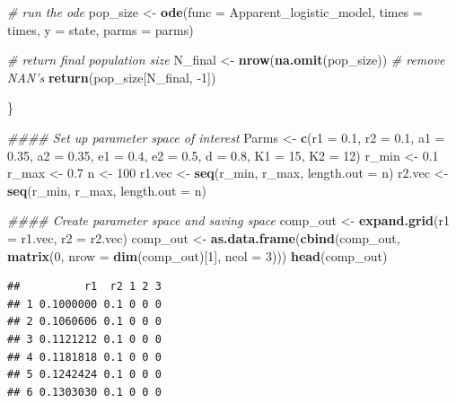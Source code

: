 \documentclass[
]{book}
\newenvironment{Shaded}{\begin{snugshade}}{\end{snugshade}}
\newcommand{\CommentTok}[1]{\textcolor[rgb]{0.56,0.35,0.01}{\textit{#1}}}
\newcommand{\DataTypeTok}[1]{\textcolor[rgb]{0.13,0.29,0.53}{#1}}
\newcommand{\DecValTok}[1]{\textcolor[rgb]{0.00,0.00,0.81}{#1}}
\newcommand{\FloatTok}[1]{\textcolor[rgb]{0.00,0.00,0.81}{#1}}
\newcommand{\KeywordTok}[1]{\textcolor[rgb]{0.13,0.29,0.53}{\textbf{#1}}}
\newcommand{\NormalTok}[1]{#1}
\newcommand{\StringTok}[1]{\textcolor[rgb]{0.31,0.60,0.02}{#1}}
\begin{document}
\begin{Shaded}
\begin{Highlighting}[]
  \CommentTok{# run the ode}
\NormalTok{  pop_size <-}\StringTok{ }\KeywordTok{ode}\NormalTok{(}\DataTypeTok{func =}\NormalTok{ Apparent_logistic_model, }\DataTypeTok{times =}\NormalTok{ times, }\DataTypeTok{y =}\NormalTok{ state, }\DataTypeTok{parms =}\NormalTok{ parms)}

  \CommentTok{# return final population size}
\NormalTok{  N_final <-}\StringTok{ }\KeywordTok{nrow}\NormalTok{(}\KeywordTok{na.omit}\NormalTok{(pop_size))   }\CommentTok{# remove NAN's}
  \KeywordTok{return}\NormalTok{(pop_size[N_final, }\DecValTok{-1}\NormalTok{])}

\NormalTok{\}}


\CommentTok{#### Set up parameter space of interest}
\NormalTok{Parms <-}\StringTok{ }\KeywordTok{c}\NormalTok{(}\DataTypeTok{r1 =} \FloatTok{0.1}\NormalTok{, }\DataTypeTok{r2 =} \FloatTok{0.1}\NormalTok{, }\DataTypeTok{a1 =} \FloatTok{0.35}\NormalTok{, }\DataTypeTok{a2 =} \FloatTok{0.35}\NormalTok{, }\DataTypeTok{e1 =} \FloatTok{0.4}\NormalTok{, }\DataTypeTok{e2 =} \FloatTok{0.5}\NormalTok{, }\DataTypeTok{d =} \FloatTok{0.8}\NormalTok{, }\DataTypeTok{K1 =} \DecValTok{15}\NormalTok{, }\DataTypeTok{K2 =} \DecValTok{12}\NormalTok{)}
\NormalTok{r_min <-}\StringTok{ }\FloatTok{0.1}
\NormalTok{r_max <-}\StringTok{ }\FloatTok{0.7}
\NormalTok{n <-}\StringTok{ }\DecValTok{100}
\NormalTok{r1.vec <-}\StringTok{ }\KeywordTok{seq}\NormalTok{(r_min, r_max, }\DataTypeTok{length.out =}\NormalTok{ n)}
\NormalTok{r2.vec <-}\StringTok{ }\KeywordTok{seq}\NormalTok{(r_min, r_max, }\DataTypeTok{length.out =}\NormalTok{ n)}


\CommentTok{#### Create parameter space and saving space}
\NormalTok{comp_out <-}\StringTok{ }\KeywordTok{expand.grid}\NormalTok{(}\DataTypeTok{r1 =}\NormalTok{ r1.vec, }\DataTypeTok{r2 =}\NormalTok{ r2.vec)}
\NormalTok{comp_out <-}\StringTok{ }\KeywordTok{as.data.frame}\NormalTok{(}\KeywordTok{cbind}\NormalTok{(comp_out,}
                                \KeywordTok{matrix}\NormalTok{(}\DecValTok{0}\NormalTok{, }\DataTypeTok{nrow =} \KeywordTok{dim}\NormalTok{(comp_out)[}\DecValTok{1}\NormalTok{], }\DataTypeTok{ncol =} \DecValTok{3}\NormalTok{)))}
\KeywordTok{head}\NormalTok{(comp_out)}
\end{Highlighting}
\end{Shaded}

\begin{verbatim}
##          r1  r2 1 2 3
## 1 0.1000000 0.1 0 0 0
## 2 0.1060606 0.1 0 0 0
## 3 0.1121212 0.1 0 0 0
## 4 0.1181818 0.1 0 0 0
## 5 0.1242424 0.1 0 0 0
## 6 0.1303030 0.1 0 0 0
\end{verbatim}
\end{document}
